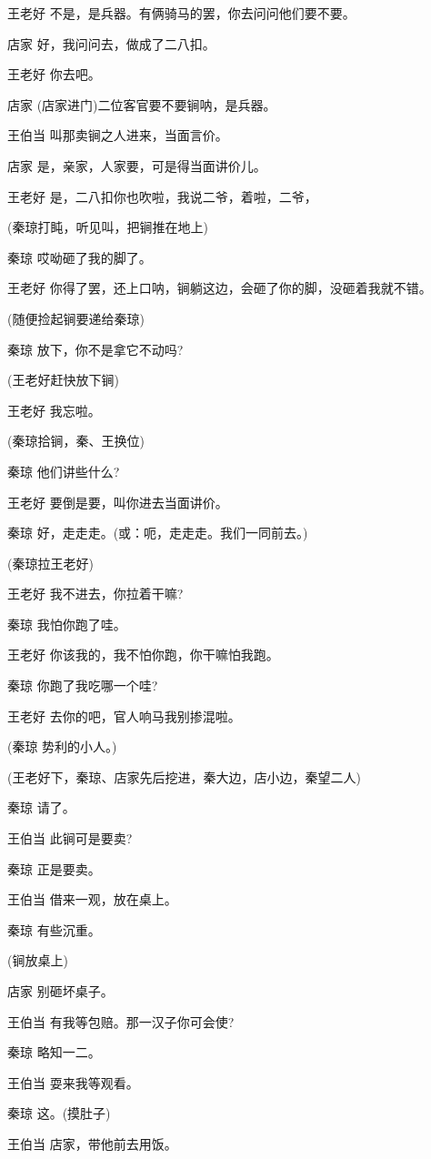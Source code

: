 王老好 不是，是兵器。有俩骑马的罢，你去问问他们要不要。

店家 好，我问问去，做成了二八扣。

王老好 你去吧。

店家 (店家进门)二位客官要不要锏呐，是兵器。

王伯当 叫那卖锏之人进来，当面言价。

店家 是，亲家，人家要，可是得当面讲价儿。

王老好 是，二八扣你也吹啦，我说二爷，着啦，二爷，

(秦琼打盹，听见叫，把锏推在地上)

秦琼 哎呦砸了我的脚了。

王老好 你得了罢，还上口呐，锏躺这边，会砸了你的脚，没砸着我就不错。

(随便捡起锏要递给秦琼)

秦琼 放下，你不是拿它不动吗?

(王老好赶快放下锏)

王老好 我忘啦。

(秦琼拾锏，秦、王换位)

秦琼 他们讲些什么?

王老好 要倒是要，叫你进去当面讲价。

秦琼 好，走走走。(或：呃，走走走。我们一同前去。)

(秦琼拉王老好)

王老好 我不进去，你拉着干嘛?

秦琼 我怕你跑了哇。

王老好 你该我的，我不怕你跑，你干嘛怕我跑。

秦琼 你跑了我吃哪一个哇?

王老好 去你的吧，官人响马我别掺混啦。

(秦琼 势利的小人。)

(王老好下，秦琼、店家先后挖进，秦大边，店小边，秦望二人)

秦琼 请了。

王伯当 此锏可是要卖?

秦琼 正是要卖。

王伯当 借来一观，放在桌上。

秦琼 有些沉重。

(锏放桌上)

店家 别砸坏桌子。

王伯当 有我等包赔。那一汉子你可会使?

秦琼 略知一二。

王伯当 耍来我等观看。

秦琼 这。(摸肚子)

王伯当 店家，带他前去用饭。

